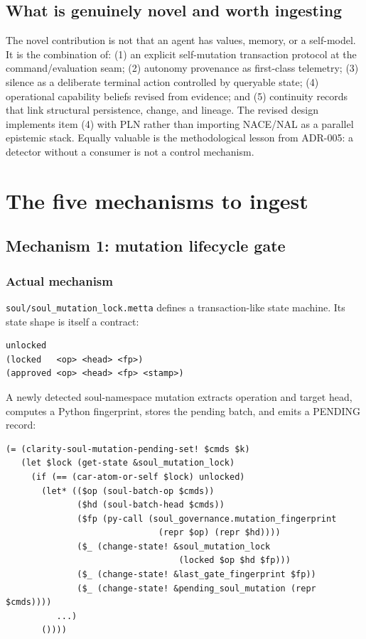 \documentclass[11pt]{article}
\begin{document}
\subsection{What is genuinely novel and worth ingesting}

The novel contribution is not that an agent has values, memory, or a self-model.
It is the combination of: (1) an explicit self-mutation transaction protocol
at the command/evaluation seam; (2) autonomy provenance as first-class telemetry;
(3) silence as a deliberate terminal action controlled by queryable state;
(4) operational capability beliefs revised from evidence; and (5) continuity
records that link structural persistence, change, and lineage.  The revised
design implements item (4) with PLN rather than importing NACE/NAL as a parallel
epistemic stack.  Equally valuable
is the methodological lesson from ADR-005: a detector without a consumer is not
a control mechanism.

\section{The five mechanisms to ingest}

\subsection{Mechanism 1: mutation lifecycle gate}

\subsubsection{Actual mechanism}

\texttt{soul/soul\_mutation\_lock.metta} defines a transaction-like state
machine.  Its state shape is itself a contract:

\begin{lstlisting}
unlocked
(locked   <op> <head> <fp>)
(approved <op> <head> <fp> <stamp>)
\end{lstlisting}

A newly detected soul-namespace mutation extracts operation and target head,
computes a Python fingerprint, stores the pending batch, and emits a PENDING
record:

\begin{lstlisting}
(= (clarity-soul-mutation-pending-set! $cmds $k)
   (let $lock (get-state &soul_mutation_lock)
     (if (== (car-atom-or-self $lock) unlocked)
       (let* (($op (soul-batch-op $cmds))
              ($hd (soul-batch-head $cmds))
              ($fp (py-call (soul_governance.mutation_fingerprint
                              (repr $op) (repr $hd))))
              ($_ (change-state! &soul_mutation_lock
                                  (locked $op $hd $fp)))
              ($_ (change-state! &last_gate_fingerprint $fp))
              ($_ (change-state! &pending_soul_mutation (repr $cmds))))
          ...)
       ())))
\end{lstlisting}
\end{document}
